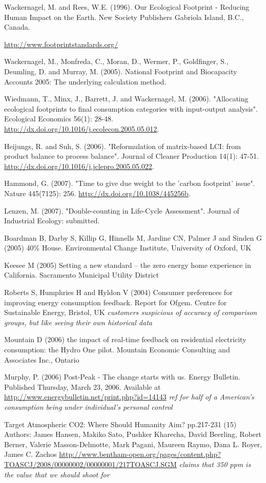 Wackernagel, M. and Rees, W.E. (1996). Our Ecological Footprint - Reducing Human Impact on the Earth. New Society Publishers Gabriola Island, B.C., Canada.

\url{http://www.footprintstandards.org/}

Wackernagel, M., Monfreda, C., Moran, D., Wermer, P., Goldfinger, S., Deumling, D. and Murray, M. (2005). National Footprint and Biocapacity Accounts 2005: The underlying calculation method.

Wiedmann, T., Minx, J., Barrett, J. and Wackernagel, M. (2006). "Allocating ecological footprints to final consumption categories with input-output analysis". Ecological Economics 56(1): 28-48. \url{http://dx.doi.org/10.1016/j.ecolecon.2005.05.012}.

Heijungs, R. and Suh, S. (2006). "Reformulation of matrix-based LCI: from product balance to process balance". Journal of Cleaner Production 14(1): 47-51. 
\url{http://dx.doi.org/10.1016/j.jclepro.2005.05.022}.

Hammond, G. (2007). "Time to give due weight to the 'carbon footprint' issue". Nature 445(7125): 256. \url{http://dx.doi.org/10.1038/445256b}.

Lenzen, M. (2007). "Double-counting in Life-Cycle Assessment". Journal of Industrial Ecology: submitted.

Boardman B, Darby S, Killip G, Hinnells M, Jardine CN, Palmer J and Sinden G (2005) 40\% House. Environmental Change Institute, University of Oxford, UK

Keesee M (2005) Setting a new standard – the zero energy home experience in California. Sacramento Municipal Utility District

Roberts S, Humphries H and Hyldon V (2004) Consumer preferences for improving energy consumption feedback. Report for Ofgem. Centre for Sustainable Energy, Bristol, UK \emph{customers suspicious of accuracy of comparison groups, but like seeing their own historical data}

Mountain D (2006) the impact of real-time feedback on residential electricity consumption: the Hydro One pilot. Mountain Economic Consulting and Associates Inc., Ontario

Murphy, P. (2006) Post-Peak - The change starts with us. Energy Bulletin. Published Thursday, March 23, 2006. Available at \url{http://www.energybulletin.net/print.php?id=14143} \emph{ref for half of a American's consumption being under individual's personal control}

Target Atmospheric CO2: Where Should Humanity Aim? pp.217-231 (15) Authors: James Hansen, Makiko Sato, Pushker Kharecha, David Beerling, Robert Berner, Valerie Masson-Delmotte, Mark Pagani, Maureen Raymo, Dana L. Royer, James C. Zachos \url{http://www.bentham-open.org/pages/content.php?TOASCJ/2008/00000002/00000001/217TOASCJ.SGM} \emph{claims that 350 ppm is the \COtwo value that we should shoot for}

